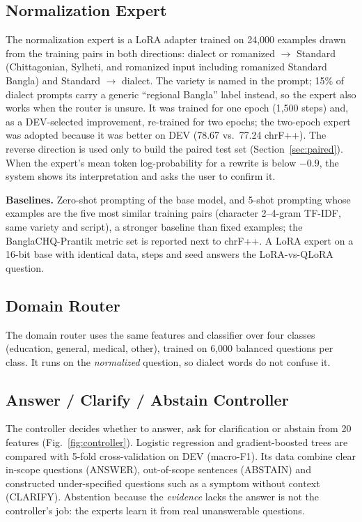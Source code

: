 \subsection{Normalization Expert}
The normalization expert is a LoRA adapter trained on 24,000 examples drawn from the training pairs in both directions: dialect or romanized $\rightarrow$ Standard (Chittagonian, Sylheti, and romanized input including romanized Standard Bangla) and Standard $\rightarrow$ dialect. The variety is named in the prompt; 15\% of dialect prompts carry a generic ``regional Bangla'' label instead, so the expert also works when the router is unsure. It was trained for one epoch (1,500 steps) and, as a DEV-selected improvement, re-trained for two epochs; the two-epoch expert was adopted because it was better on DEV (78.67 vs.\ 77.24 chrF++). The reverse direction is used only to build the paired test set (Section~\ref{sec:paired}). When the expert's mean token log-probability for a rewrite is below $-0.9$, the system shows its interpretation and asks the user to confirm it.

\textbf{Baselines.} Zero-shot prompting of the base model, and 5-shot prompting whose examples are the five most similar training pairs (character 2--4-gram TF-IDF, same variety and script), a stronger baseline than fixed examples; the BanglaCHQ-Prantik metric set \cite{prantik2025} is reported next to chrF++. A LoRA expert on a 16-bit base with identical data, steps and seed answers the LoRA-vs-QLoRA question.

\subsection{Domain Router}
The domain router uses the same features and classifier over four classes (education, general, medical, other), trained on 6,000 balanced questions per class. It runs on the \emph{normalized} question, so dialect words do not confuse it.

\subsection{Answer / Clarify / Abstain Controller}
The controller decides whether to answer, ask for clarification or abstain from 20 features (Fig.~\ref{fig:controller}). Logistic regression and gradient-boosted trees \cite{friedman2001gbm} are compared with 5-fold cross-validation on DEV (macro-F1). Its data combine clear in-scope questions (ANSWER), out-of-scope sentences (ABSTAIN) and constructed under-specified questions such as a symptom without context (CLARIFY). Abstention because the \emph{evidence} lacks the answer is not the controller's job: the experts learn it from real unanswerable questions.

